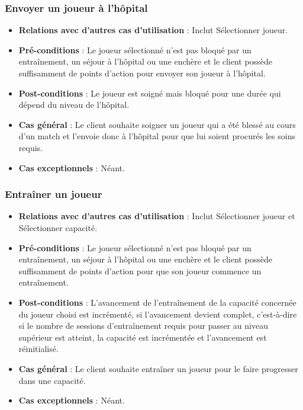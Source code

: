 \documentclass[a4paper,titlepage]{scrreprt}
\begin{document}
    \subsubsection{Envoyer un joueur à l'hôpital}
      \begin{itemize}
        \item \textbf{Relations avec d'autres cas d'utilisation}  : Inclut Sélectionner joueur.
        \item \textbf{Pré-conditions} : Le joueur sélectionné n'est pas bloqué par un entraînement, un séjour à l'hôpital ou une enchère et le client possède suffisamment de points d'action pour envoyer son joueur à l'hôpital.
        \item \textbf{Post-conditions} : Le joueur est soigné mais bloqué pour une durée qui dépend du niveau de l'hôpital.
        \item \textbf{Cas général} : Le client souhaite soigner un joueur qui a été blessé au cours d'un match et l'envoie donc à l'hôpital pour que lui soient procurés les soins requis.
        \item \textbf{Cas exceptionnels} : Néant.
      \end{itemize}

    \subsubsection{Entraîner un joueur}
      \begin{itemize}
        \item \textbf{Relations avec d'autres cas d'utilisation}  : Inclut Sélectionner joueur et Sélectionner capacité.
        \item \textbf{Pré-conditions} : Le joueur sélectionné n'est pas bloqué par un entraînement, un séjour à l'hôpital ou une enchère et le client possède suffisamment de points d'action pour que son joueur commence un entraînement.
        \item \textbf{Post-conditions} : L'avancement de l'entraînement de la capacité concernée du joueur choisi est incrémenté, si l'avancement devient complet, c'est-à-dire si le nombre de sessions d'entraînement requis pour passer au niveau supérieur est atteint, la capacité est incrémentée et l'avancement est réinitialisé.
        \item \textbf{Cas général} : Le client souhaite entraîner un joueur pour le faire progresser dans une capacité.
        \item \textbf{Cas exceptionnels} : Néant.
      \end{itemize}
\end{document}
